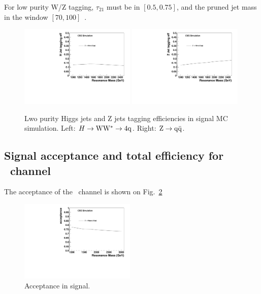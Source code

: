 For low purity W/Z tagging, $\tau_{21}$ must be in $[0.5, 0.75]$, 
and the pruned jet mass in the window $[70, 100]$~\GeVcc.


\begin{figure}[htb]
\begin{center}
\includegraphics[width=0.49\textwidth]{EXO-14-009/HqqqqZqqfigs/Signal/H-taggingEff-8TeV-LowP.pdf}
\includegraphics[width=0.49\textwidth]{EXO-14-009/HqqqqZqqfigs/Signal/Z-taggingEff-8TeV-LowP.pdf}
\end{center}
\caption{
  Lwo purity Higgs jets and Z jets tagging efficiencies in signal MC simulation.
  Left: $H\to{\rm W}{\rm W}^*\to4{\rm q}$. Right: ${\rm Z}\to{\rm q\bar{q}}$.  }
\label{fig:LowPurity}
\end{figure}



\subsection{Signal acceptance and total efficiency for \HwwZqq\ channel}

The acceptance of the \HwwZqq\ channel is shown on Fig.~\ref{fig:HwwAcc}

\begin{figure}[htb]
\begin{center}
\includegraphics[width=0.49\textwidth]{EXO-14-009/HqqqqZqqfigs/Signal/HqqqqZqq-signal-acc-8TeV.pdf}
\end{center}
\caption{
Acceptance in signal. 
}
\label{fig:HwwAcc}
\end{figure}

